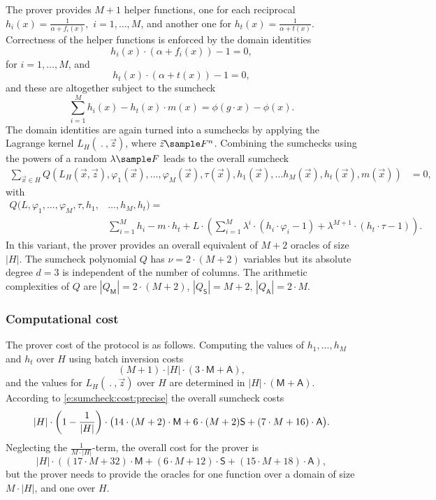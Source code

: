 The prover provides $M+1$ helper functions, one for each reciprocal
$
h_i  (x) = \frac{1}{\alpha + f_i(x)},
$
$i=1,\ldots, M$, and another one for
$
h_{t}(x) = \frac{1}{\alpha + t(x)}.
$
Correctness of the helper functions is enforced by the domain identities
\[
h_i(x) \cdot (\alpha + f_i(x)) - 1 = 0,
\]
for $i=1, \ldots, M$, and
\[
h_{t}(x) \cdot (\alpha + t(x)) - 1 = 0 ,
\]
and these are altogether subject to the sumcheck
\[
\sum_{i=1}^{M} h_i(x) - h_t(x)\cdot m(x) = \phi(g\cdot x ) - \phi(x).
\]
The domain identities are again turned into a sumchecks by applying the Lagrange kernel $L_{H}(\:.\:, \vec z)$, where $\vec z\sample F^n$.
Combining the sumchecks using the powers of a random $\lambda\sample F$ leads to the overall sumcheck  
\begin{align*} 
\sum_{\vec x \in H} Q(L_H(\vec x, \vec z),  \varphi_1(\vec x),\ldots, \varphi_M(\vec x), \tau(\vec x), h_1(\vec x),\ldots h_{M}(\vec x), h_t(\vec x), m(\vec x))&= 0,
\end{align*}
with
\begin{equation}
\label{e:lookup:Q:linear}
\begin{aligned}
Q(L, \varphi_1,\ldots, \varphi_M, \tau, h_1,&\ldots, h_M, h_t) =   
\\
&
\sum_{i=1}^{M} h_i - m\cdot  h_t 
+   L\cdot\left(\sum_{i=1}^{M}\lambda^i \cdot (h_i \cdot \varphi_i - 1)+ \lambda^{M+1} \cdot (h_{t}\cdot\tau - 1) \right).
\end{aligned}
\end{equation}
In this variant, the prover provides an overall equivalent of $M+2$ oracles of size $|H|$. 
The sumcheck polynomial $Q$ has  $\nu= 2\cdot (M + 2)$ variables but its absolute degree $d=3$ is independent of the number of columns.
The arithmetic complexities of $Q$ are $|Q_\mathsf M|=  2\cdot (M+2)$, $|Q_\mathsf S|= M + 2$, $|Q_\mathsf A|=2\cdot M$.

\subsubsection{Computational cost}
The prover cost of the protocol is as follows. 
Computing the values of $h_1, \ldots, h_M$ and $h_t$ over $H$ using batch inversion costs 
\[
(M+1)\cdot |H| \cdot(3 \cdot \mathsf M + \mathsf A),
\]
and the values for $L_{H}(\:.\:, \vec z)$ over $H$ are determined in  $|H|\cdot (\mathsf M + \mathsf A)$.
According to \eqref{e:sumcheck:cost:precise} the overall sumcheck costs
\[
|H| \cdot \left(1-\frac{1}{|H|}\right)\cdot \big(14\cdot (M+2) \cdot \textsf M + 6\cdot (M+2)\textsf S + (7\cdot M +16) \cdot \textsf A\big).
\]
Neglecting the $\frac{1}{M\cdot |H|}$-term, the overall cost for the prover is
\begin{equation}
\label{e:lookup:large:cost}
|H|\cdot ((17\cdot M + 32)\cdot\mathsf M + (6\cdot M + 12)\cdot\mathsf S + (15\cdot M + 18)\cdot\mathsf A),
\end{equation}
but the prover needs to provide the oracles for one function over  a domain of size $M\cdot|H|$, and one over $H$. 
